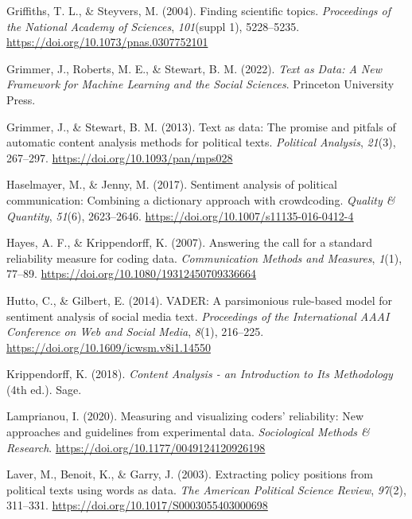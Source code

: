 \documentclass[
]{book}
\newlength{\cslhangindent}
\newenvironment{CSLReferences}[2] %
 {\begin{list}{}{%
  \setlength{\itemindent}{0pt}
  \setlength{\leftmargin}{0pt}
  \setlength{\parsep}{0pt}
  \ifodd #1
   \setlength{\leftmargin}{\cslhangindent}
   \setlength{\itemindent}{-1\cslhangindent}
  \fi
  \setlength{\itemsep}{#2\baselineskip}}}
 {\end{list}}
\begin{document}
\begin{CSLReferences}{1}{2}
Griffiths, T. L., \& Steyvers, M. (2004). Finding scientific topics. \emph{Proceedings of the National Academy of Sciences}, \emph{101}(suppl 1), 5228--5235. \url{https://doi.org/10.1073/pnas.0307752101}

Grimmer, J., Roberts, M. E., \& Stewart, B. M. (2022). \emph{{Text as Data: A New Framework for Machine Learning and the Social Sciences}}. Princeton University Press.

Grimmer, J., \& Stewart, B. M. (2013). Text as data: The promise and pitfals of automatic content analysis methods for political texts. \emph{Political Analysis}, \emph{21}(3), 267--297. \url{https://doi.org/10.1093/pan/mps028}

Haselmayer, M., \& Jenny, M. (2017). Sentiment analysis of political communication: Combining a dictionary approach with crowdcoding. \emph{Quality \& Quantity}, \emph{51}(6), 2623--2646. \url{https://doi.org/10.1007/s11135-016-0412-4}

Hayes, A. F., \& Krippendorff, K. (2007). Answering the call for a standard reliability measure for coding data. \emph{Communication Methods and Measures}, \emph{1}(1), 77--89. \url{https://doi.org/10.1080/19312450709336664}

Hutto, C., \& Gilbert, E. (2014). VADER: A parsimonious rule-based model for sentiment analysis of social media text. \emph{Proceedings of the International AAAI Conference on Web and Social Media}, \emph{8}(1), 216--225. \url{https://doi.org/10.1609/icwsm.v8i1.14550}

Krippendorff, K. (2018). \emph{{Content Analysis - an Introduction to Its Methodology}} (4th ed.). Sage.

Lamprianou, I. (2020). Measuring and visualizing coders' reliability: New approaches and guidelines from experimental data. \emph{Sociological Methods \& Research}. \url{https://doi.org/10.1177/0049124120926198}

Laver, M., Benoit, K., \& Garry, J. (2003). Extracting policy positions from political texts using words as data. \emph{The American Political Science Review}, \emph{97}(2), 311--331. \url{https://doi.org/10.1017/S0003055403000698}


\end{CSLReferences}
\end{document}
